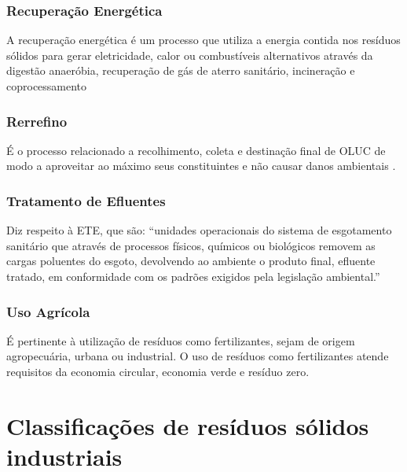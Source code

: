 \subsubsection{Recuperação Energética}

A recuperação energética é um processo que utiliza a energia contida nos resíduos sólidos para gerar eletricidade, calor ou combustíveis alternativos através da digestão anaeróbia, recuperação de gás de aterro sanitário, incineração e coprocessamento \cite{abren_abren_2021}

\subsubsection{Rerrefino} 

É o processo relacionado a recolhimento, coleta e destinação final de \gls{OLUC} de modo a aproveitar ao máximo seus constituintes e não causar danos ambientais \cite{diagnostico_cristine}.

\subsubsection{Tratamento de Efluentes}

Diz respeito à \gls{ETE}, que são: “unidades operacionais do sistema de esgotamento sanitário que através de processos físicos, químicos ou biológicos removem as cargas poluentes do esgoto, devolvendo ao ambiente o produto final,  efluente tratado, em conformidade com os padrões exigidos pela legislação ambiental.” \parencite{casan_ete_2023}

\subsubsection{Uso Agrícola}

É pertinente à utilização de resíduos como fertilizantes, sejam de origem agropecuária, urbana ou industrial. O uso de resíduos como fertilizantes atende requisitos da economia circular, economia verde e resíduo zero. \cite{diagnostico_cristine}


\section{Classificações de resíduos sólidos industriais}


